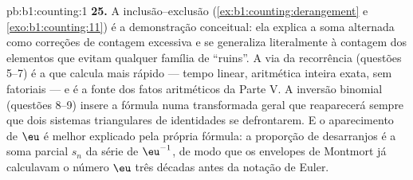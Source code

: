 \begin{solution}{pb:b1:counting:1}
\textbf{25.} A inclusão--exclusão
(\cref{ex:b1:counting:derangement} e \cref{exo:b1:counting:11})
é a demonstração conceitual: ela explica a soma alternada como
correções de contagem excessiva e se generaliza literalmente à contagem
dos elementos que evitam qualquer família de  ``ruins''. A via
da recorrência (questões 5--7) é a que calcula mais rápido --- tempo
linear, aritmética inteira exata, sem fatoriais --- e é a fonte dos
fatos aritméticos da Parte V. A inversão binomial (questões 8--9) insere
a fórmula numa transformada geral que reaparecerá sempre que
dois sistemas triangulares de identidades se defrontarem. E o
aparecimento de $\eu$ é melhor explicado pela própria fórmula: a
proporção de desarranjos é a soma parcial $s_n$ da série de
$\eu^{-1}$, de modo que os envelopes de Montmort já calculavam o número
$\eu$ três décadas antes da notação de Euler.
\end{solution}
